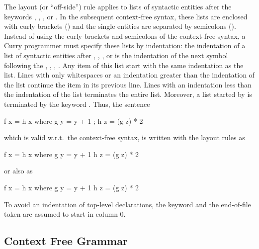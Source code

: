 The layout (or ``off-side'') rule applies to lists of syntactic
entities after the keywords ,
, , or .
In the subsequent context-free syntax,
these lists are enclosed with
curly brackets (\term{\{ \}}) and the single entities are
separated by semicolons (\term{;}). Instead of using the curly
brackets and semicolons of the context-free syntax,
a Curry programmer must specify these lists
by indentation: the indentation of a list of syntactic
entities after , , , or  is the
indentation of the next symbol following the
, , , . Any item of this list
start with the same indentation as the list. Lines with only whitespaces or
an indentation greater than the indentation of the list continue
the item in its previous line. Lines with an indentation less than
the indentation of the list terminates the entire list.
Moreover, a list started by  is terminated by the
keyword . Thus, the sentence
\begin{curry}
f x = h x where { g y = y + 1 ; h z = (g z) * 2 }
\end{curry}
which is valid w.r.t.\ the context-free syntax, is written
with the layout rules as
\begin{curry}
f x = h x
 where g y = y + 1
       h z = (g z) * 2
\end{curry}
or also as
\begin{curry}
f x = h x  where
  g y = y + 1
  h z = (g z)
          * 2
\end{curry}
To avoid an indentation of top-level declarations,
the keyword  and the end-of-file token are
assumed to start in column 0.

\subsection{Context Free Grammar}

